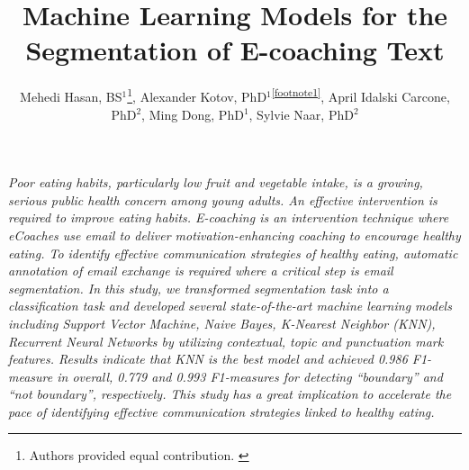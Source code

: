 \documentclass{amia}
\begin{document}
\title{Machine Learning Models for the Segmentation of E-coaching Text}

\author{Mehedi Hasan, BS$^{1}$\footnote[1]{Authors provided equal contribution. \label{footnote1}}, Alexander Kotov, PhD$^{1}$\textsuperscript{\ref{footnote1}}, April Idalski Carcone, PhD$^{2}$, Ming Dong, PhD$^{1}$, Sylvie Naar, PhD$^{2}$}


\maketitle

\textit{Poor eating habits, particularly low fruit and vegetable intake, is a growing, serious public health concern among young adults. An effective intervention is required to improve eating habits. E-coaching is an intervention technique where eCoaches use email to deliver motivation-enhancing coaching to encourage healthy eating. To identify effective communication strategies of healthy eating, automatic annotation of email exchange is required where a critical step is email segmentation. In this study, we transformed segmentation task into a classification task and developed several state-of-the-art machine learning models including Support Vector Machine, Naive Bayes, K-Nearest Neighbor (KNN), Recurrent Neural Networks by utilizing contextual, topic and punctuation mark features. Results indicate that KNN is the best model and achieved 0.986 F1-measure in overall, 0.779 and 0.993 F1-measures for detecting ``boundary'' and ``not boundary'', respectively. This study has a great implication to accelerate the pace of identifying effective communication strategies linked to healthy eating.}
\end{document}
